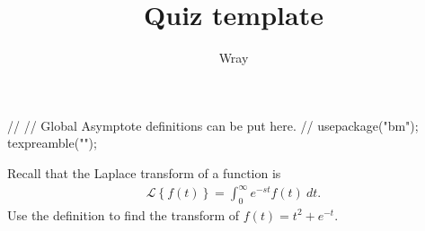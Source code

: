 \documentclass[addpoints, 12pt]{exam}
\title{Quiz template}
\author{Wray}
\newcommand{\laplace}[1]{\mathcal{L} \left\lbrace #1 \right\rbrace}
\begin{document}
\begin{asydef}
//
// Global Asymptote definitions can be put here.
//
usepackage("bm");
texpreamble("\def\V#1{\bm{#1}}");
\end{asydef}



\bigskip

             
\bigskip
\bigskip

\smallskip

\begin{questions}

\question[20]
Recall that the Laplace transform of a function is
\begin{align*}
	\laplace{f(t)} = \int_0^{\infty} e^{-st} f(t) \> dt.
\end{align*}
Use the definition to find the transform of $f(t) = t^2 + e^{-t}$.
\clearpage

\end{questions}
\end{document}
